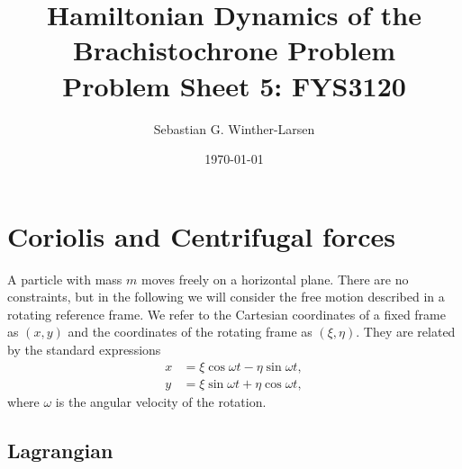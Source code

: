 \documentclass[11pt]{amsart}
\title[Brachistochrone Problem]{Hamiltonian Dynamics of the Brachistochrone Problem\\
	\hrulefill \small{ Problem Sheet 5: FYS3120 } \hrulefill}
\author[Winther-Larsen]{Sebastian G. Winther-Larsen}
\date{\today}
\begin{document}
\maketitle

\section{Coriolis and Centrifugal forces}
A particle with mass $m$ moves freely on a horizontal plane. There are no constraints, but in the following we will consider the free motion described in a rotating reference frame. We refer to the Cartesian coordinates of a fixed frame as $(x,y)$ and the coordinates of the rotating frame as $(\xi, \eta)$. They are related by the standard expressions
\begin{align}
x &= \xi\cos\omega t - \eta\sin\omega t, \\
y &= \xi\sin\omega t + \eta\cos\omega t,
\end{align}
where $\omega$ is the angular velocity of the rotation.

\subsection{Lagrangian}
\end{document}
